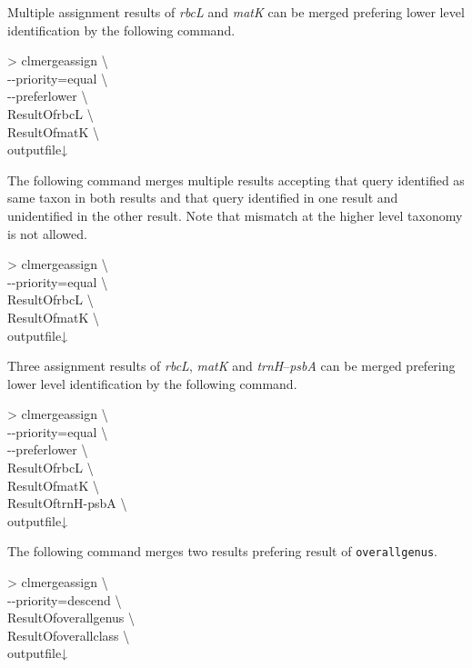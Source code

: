 \documentclass[titlepage,10pt,a4paper,english]{jsbook}
\newenvironment{cmd}{\begin{oframed}\raggedright\ttfamily\footnotesize\setlength{\baselineskip}{1.4em}}{\end{oframed}\vspace{-1em}}
\begin{document}
Multiple assignment results of \textit{rbcL} and \textit{matK} can be merged prefering lower level identification by the following command.

\begin{cmd}
{\textgreater} clmergeassign {\textbackslash}\\
{-}{-}priority=equal {\textbackslash}\\
{-}{-}preferlower {\textbackslash}\\
ResultOfrbcL {\textbackslash}\\
ResultOfmatK {\textbackslash}\\
outputfile↓
\end{cmd}

The following command merges multiple results accepting that query identified as same taxon in both results and that query identified in one result and unidentified in the other result.
Note that mismatch at the higher level taxonomy is not allowed.

\begin{cmd}
{\textgreater} clmergeassign {\textbackslash}\\
{-}{-}priority=equal {\textbackslash}\\
ResultOfrbcL {\textbackslash}\\
ResultOfmatK {\textbackslash}\\
outputfile↓
\end{cmd}

Three assignment results of \textit{rbcL}, \textit{matK} and \textit{trnH}--\textit{psbA} can be merged prefering lower level identification by the following command.

\begin{cmd}
{\textgreater} clmergeassign {\textbackslash}\\
{-}{-}priority=equal {\textbackslash}\\
{-}{-}preferlower {\textbackslash}\\
ResultOfrbcL {\textbackslash}\\
ResultOfmatK {\textbackslash}\\
ResultOftrnH-psbA {\textbackslash}\\
outputfile↓
\end{cmd}

The following command merges two results prefering result of \texttt{overall{\textunderscore}genus}.

\begin{cmd}
{\textgreater} clmergeassign {\textbackslash}\\
{-}{-}priority=descend {\textbackslash}\\
ResultOfoverall{\textunderscore}genus {\textbackslash}\\
ResultOfoverall{\textunderscore}class {\textbackslash}\\
outputfile↓
\end{cmd}
\end{document}
